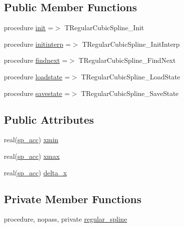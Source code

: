 \subsection*{Public Member Functions}
\begin{DoxyCompactItemize}
\item 
procedure \mbox{\hyperlink{structinterpolation_1_1tregularcubicspline_ac96f6a32fbe53f10dc73303aa05e9cdb}{init}} =$>$ T\+Regular\+Cubic\+Spline\+\_\+\+Init
\item 
procedure \mbox{\hyperlink{structinterpolation_1_1tregularcubicspline_a9c619cfd84a46375256eaa29f42a64dc}{initinterp}} =$>$ T\+Regular\+Cubic\+Spline\+\_\+\+Init\+Interp
\item 
procedure \mbox{\hyperlink{structinterpolation_1_1tregularcubicspline_a2f63fa4c9dbb1359da874f0a9961bfc9}{findnext}} =$>$ T\+Regular\+Cubic\+Spline\+\_\+\+Find\+Next
\item 
procedure \mbox{\hyperlink{structinterpolation_1_1tregularcubicspline_a417bec2fae87ed5d5f56fca5736e15e0}{loadstate}} =$>$ T\+Regular\+Cubic\+Spline\+\_\+\+Load\+State
\item 
procedure \mbox{\hyperlink{structinterpolation_1_1tregularcubicspline_aef8c3359fb73070a49f37c1d6e214b0c}{savestate}} =$>$ T\+Regular\+Cubic\+Spline\+\_\+\+Save\+State
\end{DoxyCompactItemize}
\subsection*{Public Attributes}
\begin{DoxyCompactItemize}
\item 
real(\mbox{\hyperlink{namespaceinterpolation_af72aa9a05feb8ef90b2d26e4a013abf3}{sp\+\_\+acc}}) \mbox{\hyperlink{structinterpolation_1_1tregularcubicspline_ae119fa974d0affa5f8bcdcc19bd8c3a7}{xmin}}
\item 
real(\mbox{\hyperlink{namespaceinterpolation_af72aa9a05feb8ef90b2d26e4a013abf3}{sp\+\_\+acc}}) \mbox{\hyperlink{structinterpolation_1_1tregularcubicspline_a7d69fe51d1195467af6ccd10d0526cd5}{xmax}}
\item 
real(\mbox{\hyperlink{namespaceinterpolation_af72aa9a05feb8ef90b2d26e4a013abf3}{sp\+\_\+acc}}) \mbox{\hyperlink{structinterpolation_1_1tregularcubicspline_a18ac6106071edf542e4d6d27716c3eb0}{delta\+\_\+x}}
\end{DoxyCompactItemize}
\subsection*{Private Member Functions}
\begin{DoxyCompactItemize}
\item 
procedure, nopass, private \mbox{\hyperlink{structinterpolation_1_1tregularcubicspline_ad6a09f7b17ac162841db403cc24f67f9}{regular\+\_\+spline}}
\end{DoxyCompactItemize}


